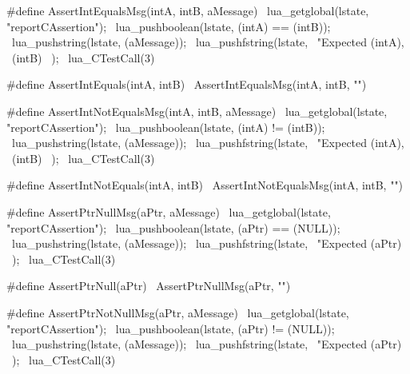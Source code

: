 \stopTestSuite

\startTestSuite[assertIntEquals]

\startCHeader
#define AssertIntEqualsMsg(intA, intB, aMessage) \
  lua_getglobal(lstate, "reportCAssertion");     \
  lua_pushboolean(lstate, (intA) == (intB));     \
  lua_pushstring(lstate, (aMessage));            \
  lua_pushfstring(lstate,                        \
      "Expected %
      (intA),                                    \
      (intB)                                     \
    );                                           \
  lua_CTestCall(3)

#define AssertIntEquals(intA, intB) \
  AssertIntEqualsMsg(intA, intB, "")
\stopCHeader

\stopTestSuite

\startTestSuite[assertIntNotEquals]

\startCHeader
#define AssertIntNotEqualsMsg(intA, intB, aMessage) \
  lua_getglobal(lstate, "reportCAssertion");        \
  lua_pushboolean(lstate, (intA) != (intB));        \
  lua_pushstring(lstate, (aMessage));               \
  lua_pushfstring(lstate,                           \
      "Expected %
      (intA),                                       \
      (intB)                                        \
    );                                              \
  lua_CTestCall(3)

#define AssertIntNotEquals(intA, intB) \
  AssertIntNotEqualsMsg(intA, intB, "")
\stopCHeader

\stopTestSuite

\startTestSuite[assertPrtNull]

\startCHeader
#define AssertPtrNullMsg(aPtr, aMessage)     \
  lua_getglobal(lstate, "reportCAssertion"); \
  lua_pushboolean(lstate, (aPtr) == (NULL)); \
  lua_pushstring(lstate, (aMessage));        \
  lua_pushfstring(lstate,                    \
      "Expected %
      (aPtr)                                 \
    );                                       \
  lua_CTestCall(3)

#define AssertPtrNull(aPtr) \
  AssertPtrNullMsg(aPtr, "")
\stopCHeader

\stopTestSuite

\startTestSuite[assertPtrNotNull]

\startCHeader
#define AssertPtrNotNullMsg(aPtr, aMessage)  \
  lua_getglobal(lstate, "reportCAssertion"); \
  lua_pushboolean(lstate, (aPtr) != (NULL)); \
  lua_pushstring(lstate, (aMessage));        \
  lua_pushfstring(lstate,                    \
      "Expected %
      (aPtr)                                 \
    );                                       \
  lua_CTestCall(3)

